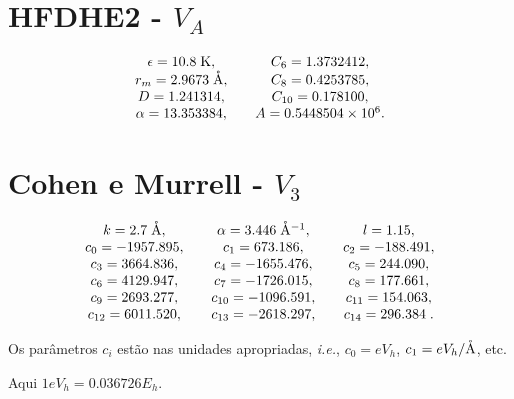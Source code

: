 \documentclass[12pt,twoside,a4paper]{report}
\begin{document}
\section{HFDHE2 - $V_A$}

\begin{equation} \nonumber
\begin{array}{ccc}
\epsilon=10.8 \; {\rm K}, & & C_6=1.3732412, \\
r_m=2.9673 \; {\rm \mathring{A}}, & & C_8=0.4253785,\\
D=1.241314, & & C_{10}=0.178100, \\
\alpha=13.353384, & & A=0.5448504 \times 10^6.
\end{array}
\end{equation}

\section{Cohen e Murrell - $V_3$}

\begin{equation} \nonumber
\begin{array}{ccccc}
k=2.7 \; {\rm \mathring{A}}, & & \alpha=3.446 \; {\rm \mathring{A}^{-1}}, & 
& l=1.15, \\
c_0=-1957.895, & & c_1=673.186, & & c_2=-188.491, \\
c_3=3664.836, & & c_4=-1655.476, & & c_5=244.090, \\
c_6=4129.947, & & c_7=-1726.015, & & c_8=177.661, \\
c_9=2693.277, & & c_{10}=-1096.591, & & c_{11}=154.063, \\
c_{12}=6011.520, & & c_{13}=-2618.297, & & c_{14}=296.384 \;.
\end{array}
\end{equation}

\noindent Os parâmetros $c_i$ estão nas unidades apropriadas, {\sl i.e.}, $c_0=eV_h$, 
$c_1=eV_h/{\rm \mathring{A}}$, etc.

\noindent Aqui $1eV_h=0.036726 E_h$.
\end{document}
